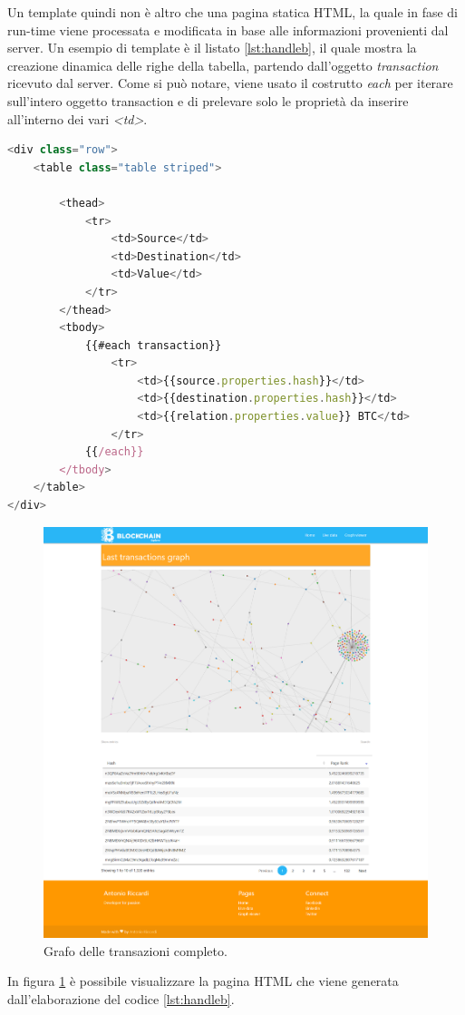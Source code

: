 \begin{itemize}
Un template quindi non è altro che una pagina statica HTML, la quale in fase di run-time viene processata e modificata in base alle informazioni provenienti dal server. Un esempio di template è il listato \ref{lst:handleb}, il quale mostra la creazione dinamica delle righe della tabella, partendo dall'oggetto \textit{transaction} ricevuto dal server. Come si può notare, viene usato il costrutto \textit{each} per iterare sull'intero oggetto transaction e di prelevare solo le proprietà da inserire all'interno dei vari \textit{<td>}.

\begin{lstlisting}[language=Javascript, label=lst:handleb, caption={Template Handlebars.}]
<div class="row">
    <table class="table striped">

        <thead>
            <tr>
                <td>Source</td>
                <td>Destination</td>
                <td>Value</td>
            </tr>
        </thead>
        <tbody>
            {{#each transaction}}
                <tr>
                    <td>{{source.properties.hash}}</td>
                    <td>{{destination.properties.hash}}</td>
                    <td>{{relation.properties.value}} BTC</td>
                </tr>
            {{/each}}
        </tbody>
    </table>
</div>
\end{lstlisting}


\begin{figure}[H]
	\centering
	\includegraphics[width=\textwidth, height=0.50\textheight]{images/graphView.png}
	\caption{Grafo delle transazioni completo.}
	\label{fig:tableView}
\end{figure}

In figura \ref{fig:tableView} è possibile visualizzare la pagina HTML che viene generata dall'elaborazione del codice \ref{lst:handleb}. 

\end{itemize}